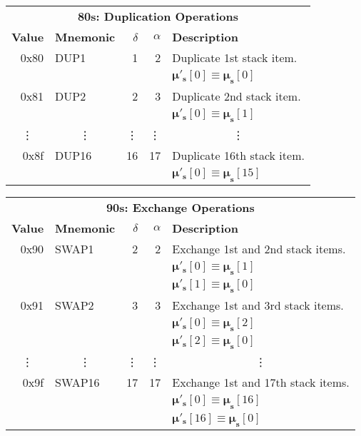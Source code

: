 \documentclass[9pt,oneside]{amsart}
\begin{document}
\begin{tabular*}{\columnwidth}[h]{rlrrl}
\toprule
\multicolumn{5}{c}{\textbf{80s: Duplication Operations}} \vspace{5pt} \\
\textbf{Value} & \textbf{Mnemonic} & $\delta$ & $\alpha$ & \textbf{Description} \vspace{5pt} \\
0x80 & {\small DUP1} & 1 & 2 & Duplicate 1st stack item. \\
&&&& $\boldsymbol{\mu}'_\mathbf{s}[0] \equiv \boldsymbol{\mu}_\mathbf{s}[0]$ \\
\midrule
0x81 & {\small DUP2} & 2 & 3 & Duplicate 2nd stack item. \\
&&&& $\boldsymbol{\mu}'_\mathbf{s}[0] \equiv \boldsymbol{\mu}_\mathbf{s}[1]$ \\
\midrule
\multicolumn{1}{c}{\vdots} & \multicolumn{1}{c}{\vdots} & \vdots & \vdots & \multicolumn{1}{c}{\vdots} \\
\midrule
0x8f & {\small DUP16} & 16 & 17 & Duplicate 16th stack item. \\
&&&& $\boldsymbol{\mu}'_\mathbf{s}[0] \equiv \boldsymbol{\mu}_\mathbf{s}[15]$ \\
\bottomrule
\end{tabular*}

\begin{tabular*}{\columnwidth}[h]{rlrrl}
\toprule
\multicolumn{5}{c}{\textbf{90s: Exchange Operations}} \vspace{5pt} \\
\textbf{Value} & \textbf{Mnemonic} & $\delta$ & $\alpha$ & \textbf{Description} \vspace{5pt} \\
0x90 & {\small SWAP1} & 2 & 2 & Exchange 1st and 2nd stack items. \\
&&&& $\boldsymbol{\mu}'_\mathbf{s}[0] \equiv \boldsymbol{\mu}_\mathbf{s}[1]$ \\
&&&& $\boldsymbol{\mu}'_\mathbf{s}[1] \equiv \boldsymbol{\mu}_\mathbf{s}[0]$ \\
\midrule
0x91 & {\small SWAP2} & 3 & 3 & Exchange 1st and 3rd stack items. \\
&&&& $\boldsymbol{\mu}'_\mathbf{s}[0] \equiv \boldsymbol{\mu}_\mathbf{s}[2]$ \\
&&&& $\boldsymbol{\mu}'_\mathbf{s}[2] \equiv \boldsymbol{\mu}_\mathbf{s}[0]$ \\
\midrule
\multicolumn{1}{c}{\vdots} & \multicolumn{1}{c}{\vdots} & \vdots & \vdots & \multicolumn{1}{c}{\vdots} \\
\midrule
0x9f & {\small SWAP16} & 17 & 17 & Exchange 1st and 17th stack items. \\
&&&& $\boldsymbol{\mu}'_\mathbf{s}[0] \equiv \boldsymbol{\mu}_\mathbf{s}[16]$ \\
&&&& $\boldsymbol{\mu}'_\mathbf{s}[16] \equiv \boldsymbol{\mu}_\mathbf{s}[0]$ \\
\bottomrule
\end{tabular*}
\end{document}
